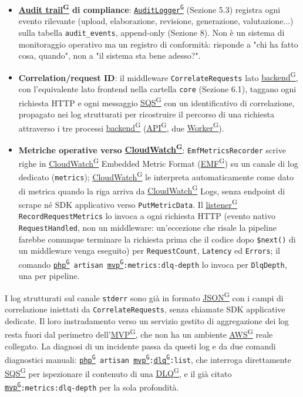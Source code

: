 \documentclass[a4paper,12pt]{article}
\providecommand{\glslink}[2]{\href{https://alittlebyte-19.github.io/Documentazione/glossario.html\#gls-#1}{\underline{#2}\textsuperscript{\scriptsize G}}}
\begin{document}
\begin{itemize}
    \item \textbf{\glslink{audit-trail}{Audit trail} di compliance}: \texttt{\glslink{auditlogger}{AuditLogger}} (Sezione 5.3) registra ogni evento rilevante (upload, elaborazione, revisione, generazione, valutazione...) sulla tabella \texttt{audit\_events}, append-only (Sezione 8). Non è un sistema di monitoraggio operativo ma un registro di conformità: risponde a "chi ha fatto cosa, quando", non a "il sistema sta bene adesso?".
    \item \textbf{Correlation/request ID}: il middleware \texttt{CorrelateRequests} lato \glslink{backend}{backend}, con l'equivalente lato frontend nella cartella \texttt{core} (Sezione 6.1), taggano ogni richiesta HTTP e ogni messaggio \glslink{sqs-simple-queue-service}{SQS} con un identificativo di correlazione, propagato nei log strutturati per ricostruire il percorso di una richiesta attraverso i tre processi \glslink{backend}{backend} (\glslink{api-application-programming-interface}{API}, due \glslink{worker}{Worker}).
    \item \textbf{Metriche operative verso \glslink{cloudwatch}{CloudWatch}}: \texttt{EmfMetricsRecorder} scrive righe in \glslink{cloudwatch}{CloudWatch} Embedded Metric Format (\glslink{emf}{EMF}) su un canale di log dedicato (\texttt{metrics}); \glslink{cloudwatch}{CloudWatch} le interpreta automaticamente come dato di metrica quando la riga arriva da \glslink{cloudwatch}{CloudWatch} Logs, senza endpoint di scrape né SDK applicativo verso \texttt{PutMetricData}. Il \glslink{listener}{listener} \texttt{RecordRequestMetrics} lo invoca a ogni richiesta HTTP (evento nativo \texttt{RequestHandled}, non un middleware: un'eccezione che risale la pipeline farebbe comunque terminare la richiesta prima che il codice dopo \texttt{\$next()} di un middleware venga eseguito) per \texttt{RequestCount}, \texttt{Latency} ed \texttt{Errors}; il comando \texttt{\glslink{php}{php} artisan \glslink{mvp-minimum-viable-product}{mvp}:metrics:dlq-depth} lo invoca per \texttt{DlqDepth}, una per pipeline.
\end{itemize}

I log strutturati sul canale \texttt{stderr} sono già in formato \glslink{json}{JSON} con i campi di correlazione iniettati da \texttt{CorrelateRequests}, senza chiamate SDK applicative dedicate. Il loro instradamento verso un servizio gestito di aggregazione dei log resta fuori dal perimetro dell'\glslink{mvp-minimum-viable-product}{MVP}, che non ha un ambiente \glslink{aws}{AWS} reale collegato. La diagnosi di un incidente passa da questi log e da due comandi diagnostici manuali: \texttt{\glslink{php}{php} artisan \glslink{mvp-minimum-viable-product}{mvp}:\glslink{dlq-dead-letter-queue}{dlq}:list}, che interroga direttamente \glslink{sqs-simple-queue-service}{SQS} per ispezionare il contenuto di una \glslink{dlq-dead-letter-queue}{DLQ}, e il già citato \texttt{\glslink{mvp-minimum-viable-product}{mvp}:metrics:dlq-depth} per la sola profondità.
\end{document}
